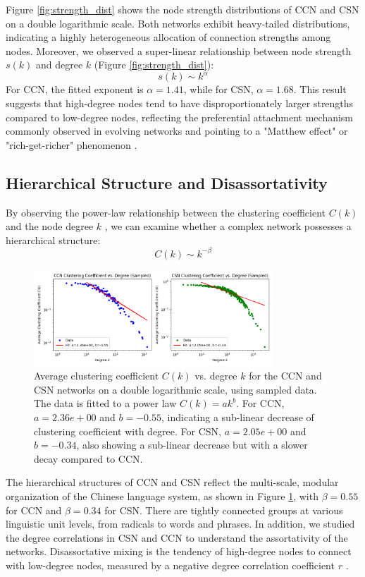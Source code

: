 \documentclass[11pt]{article}
\begin{document}
    Figure \ref{fig:strength_dist} shows the node strength distributions of CCN and CSN on a double logarithmic scale. Both networks exhibit heavy-tailed distributions, indicating a highly heterogeneous allocation of connection strengths among nodes. 
    Moreover, we observed a super-linear relationship between node strength $s(k)$ and degree $k$ (Figure \ref{fig:strength_dist}):
    \begin{equation}
    s(k) \sim k^{\alpha}
    \end{equation}
    For CCN, the fitted exponent is $\alpha=1.41$, while for CSN, $\alpha=1.68$. This result suggests that high-degree nodes tend to have disproportionately larger strengths compared to low-degree nodes, reflecting the preferential attachment mechanism commonly observed in evolving networks and pointing to a "Matthew effect" or "rich-get-richer" phenomenon \cite{barabasi1999emergence}.
\subsection{Hierarchical Structure and Disassortativity}
By observing the power-law relationship between the clustering coefficient $C(k)$ and the node degree $k$ \cite{ravasz2003hierarchical}, we can examine whether a complex network possesses a hierarchical structure:
\begin{equation}
C(k) \sim k^{-\beta}
\end{equation}
\begin{figure}[htbp]
    \centering
    \includegraphics[width=0.8\textwidth]{../analysis/clustering coefficient/clustering coefficient.png}
    \caption{Average clustering coefficient $C(k)$ vs. degree $k$ for the CCN and CSN networks on a double logarithmic scale, using sampled data. The data is fitted to a power law $C(k) = ak^b$. For CCN, $a=2.36e+00$ and $b=-0.55$, indicating a sub-linear decrease of clustering coefficient with degree. For CSN, $a=2.05e+00$ and $b=-0.34$, also showing a sub-linear decrease but with a slower decay compared to CCN.}
    \label{fig:hierarchical}
    \end{figure}
    The hierarchical structures of CCN and CSN reflect the multi-scale, modular organization of the Chinese language system, as shown in Figure \ref{fig:hierarchical}, with $\beta=0.55$ for CCN and $\beta=0.34$ for CSN. There are tightly connected groups at various linguistic unit levels, from radicals to words and phrases.
    In addition, we studied the degree correlations in CSN and CCN to understand the assortativity of the networks. Disassortative mixing is the tendency of high-degree nodes to connect with low-degree nodes, measured by a negative degree correlation coefficient $r$ \cite{newman2002assortative}.
    
\end{document}
